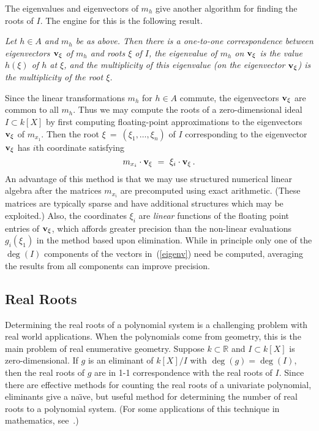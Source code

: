 The eigenvalues and eigenvectors of $m_h$ give another algorithm for finding
the roots of $I$.
The engine for this is the following result.
\medskip

{\it
Let $h\in A$ and $m_h$ be as above.
Then there is a one-to-one correspondence between eigenvectors
${\bf v}_\xi$ of $m_h$ and roots $\xi$ of $I$, the eigenvalue of $m_h$ on 
${\bf v}_\xi$ is the value $h(\xi)$ of $h$ at $\xi$, and the multiplicity
of this eigenvalue (on the eigenvector ${\bf v}_\xi$) is the
multiplicity of the root $\xi$.
}\medskip

Since the linear transformations $m_h$ for $h\in A$ commute, the
eigenvectors ${\bf v}_\xi$ are common to all $m_h$.
Thus we may compute the roots of a zero-dimensional ideal $I\subset k[X]$
by first computing floating-point approximations to the
eigenvectors ${\bf v}_\xi$ of $m_{x_1}$.
Then the root $\xi\ =\ (\xi_1,\ldots,\xi_n)$ of $I$ corresponding to the
eigenvector ${\bf v}_\xi$ has $i$th coordinate satisfying
%
\begin{equation}\label{eigenv}
   m_{x_i}\cdot {\bf v}_\xi\ =\ \xi_i \cdot {\bf v}_\xi\,.
\end{equation}
%
An advantage of this method is that we may use structured numerical linear
algebra after the matrices $m_{x_i}$ are precomputed using exact arithmetic. 
(These matrices are typically sparse and have additional structures which may
be exploited.)
Also, the coordinates $\xi_i$ are {\it linear} functions of the floating
point entries of ${\bf v}_\xi$, which affords greater precision than 
the non-linear evaluations $g_i(\xi_1)$ in the method based upon elimination.
While in principle only one of the $\deg(I)$ components of the vectors
in~(\ref{eigenv}) need be computed, averaging the results from all
components can improve precision.


\subsection{Real Roots}
Determining the real roots of a polynomial system is a challenging problem
with real world applications.
When the polynomials come from geometry, this is the main problem of
real enumerative geometry.
Suppose $k\subset{\mathbb R}$ and $I\subset k[X]$ is zero-dimensional.
If $g$ is an eliminant of $k[X]/I$ 
with $\deg(g)=\deg(I)$, then the real roots of
$g$ are in 1-1 correspondence with the real roots of $I$.
Since there are effective methods for counting the real roots of a univariate
polynomial, eliminants give a na\"\i ve, but useful method for determining the
number of real roots to a polynomial system.
(For some applications of this technique in mathematics,
see~\cite{SO:RS98,SO:So_shap-www,SO:So00b}.) 

